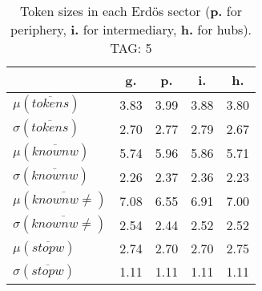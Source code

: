 \begin{table}[h!]
\begin{center}
\begin{tabular}{| l || c | c | c | c |}\hline
 & {\bf g.} & {\bf p.} & {\bf i.} & {\bf h.} \\\hline\hline
$\mu(\overline{tokens})$ & 3.83  & 3.99  & 3.88  & 3.80 \\
$\sigma(\overline{tokens})$ & 2.70  & 2.77  & 2.79  & 2.67 \\\hline
$\mu(\overline{knownw})$ & 5.74  & 5.96  & 5.86  & 5.71 \\
$\sigma(\overline{knownw})$ & 2.26  & 2.37  & 2.36  & 2.23 \\\hline
$\mu(\overline{knownw \neq})$ & 7.08  & 6.55  & 6.91  & 7.00 \\
$\sigma(\overline{knownw \neq})$ & 2.54  & 2.44  & 2.52  & 2.52 \\\hline
$\mu(\overline{stopw})$ & 2.74  & 2.70  & 2.70  & 2.75 \\
$\sigma(\overline{stopw})$ & 1.11  & 1.11  & 1.11  & 1.11 \\\hline
\end{tabular}
\caption{Token sizes in each Erd\"os sector ({{\bf p.}} for periphery, {{\bf i.}} for intermediary, {{\bf h.}} for hubs). TAG: 5}
\end{center}
\end{table}